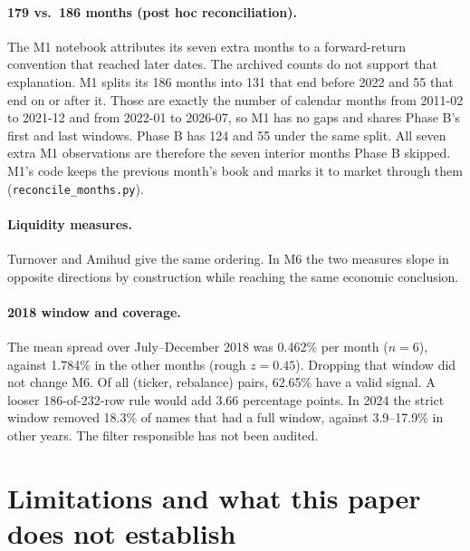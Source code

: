 \documentclass[11pt]{article}
\begin{document}
\paragraph{179 vs.\ 186 months (post hoc reconciliation).} The M1 notebook attributes
its seven extra months to a forward-return convention that reached later dates. The
archived counts do not support that explanation. M1 splits its 186 months into 131 that
end before 2022 and 55 that end on or after it. Those are exactly the number of calendar
months from 2011-02 to 2021-12 and from 2022-01 to 2026-07, so M1 has no gaps and
shares Phase B's first and last windows. Phase B has 124 and 55 under the same split.
All seven extra M1 observations are therefore the seven interior months Phase B skipped.
M1's code keeps the previous month's book and marks it to market through them
(\texttt{reconcile\_months.py}).

\paragraph{Liquidity measures.} Turnover and Amihud give the same ordering. In M6 the
two measures slope in opposite directions by construction while reaching the same
economic conclusion.

\paragraph{2018 window and coverage.} The mean spread over July--December 2018 was
0.462\% per month ($n=6$), against 1.784\% in the other months (rough $z=0.45$).
Dropping that window did not change M6. Of all (ticker, rebalance) pairs, 62.65\% have a
valid signal. A looser 186-of-232-row rule would add 3.66 percentage points. In 2024 the
strict window removed 18.3\% of names that had a full window, against 3.9--17.9\% in
other years. The filter responsible has not been audited.

\section{Limitations and what this paper does not establish}
\end{document}
